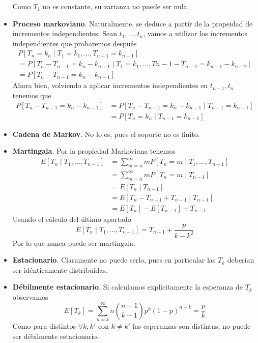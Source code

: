 \documentclass[PREyA.tex]{subfiles}
\begin{document}
\begin{example}
\begin{itemize}
Como $T_1$ no es constante, su varianza no puede ser nula.
\item \textbf{Proceso markoviano}. Naturalmente, se deduce a partir de la propeidad de incrementos independientes. Sean $t_1,\dotsc,t_n$, vamos a utilizar los incrementos independientes que probaremos después
\begin{gather*}
P[T_n =  k_n \mid T_1=k_1,\dotsc,T_{n-1}=k_{n-1}] \\= P[T_n -T_{n-1} =  k_n - k_{n-1}\mid T_1=k_1,\dotsc,T{n-1}-T_{n-2}=k_{n-1}-k_{n-2}]\\
=P[T_n-T_{n-1}=k_n - k_{n-1}]
\end{gather*}
Ahora bien, volviendo a aplicar incrementos independientes en $t_{n-1},t_n$ tenemos que 
\begin{align*}
P[T_n-T_{n-1}=k_n - k_{n-1}] &= P[T_n -T_{n-1} =k_n - k_{n-1}\mid T_{n-1}  = k_{n-1}]\\
&= P[T_n =k_n \mid T_{n-1} =k_{n-1}]
\end{align*}
\item \textbf{Cadena de Markov}. No lo es, pues el soporte no es finito.
\item \textbf{Martingala}. Por la propiedad Markoviana tenemos
\begin{align*}
E[T_n \mid T_1,\dotsc,T_{n-1}] &= \sum_{m=n}^\infty m P[T_n =m \mid T_1,\dotsc,T_{n-1}]\\
&= \sum_{m=n}^\infty m P[T_n =m \mid  T_{n-1}]\\
&=E[T_n \mid T_{n-1}] \\
&= E[T_n - T_{n-1} + T_{n-1} \mid T_{n-1}] \\
&= E[T_n] - E[T_{n-1}] + T_{n-1}
\end{align*}
Usando el cálculo del último apartado
$$
E[T_n \mid T_1,\dotsc,T_{n-1}] = T_{n-1} + \frac{p}{k-k^2}
$$
Por lo que nunca puede ser martingala.
\item \textbf{Estacionario}. Claramente no puede serlo, pues en particular las $T_k$ deberían ser idénticamente distribuidas.
\item \textbf{Débilmente estacionario}. Si calculamos explícitamente la esperanza de $T_k$ observamos
$$
E[T_k] = \sum_{n=k}^\infty n \binom{n-1}{k-1}p^k(1-p)^{n-k} = \frac{p}{k}
$$
Como para distintos $\forall k,k'$ con $k\neq k'$ las esperanzas son distintas, no puede ser débilmente estacionario.
\end{itemize}
\end{example}
\end{document}
